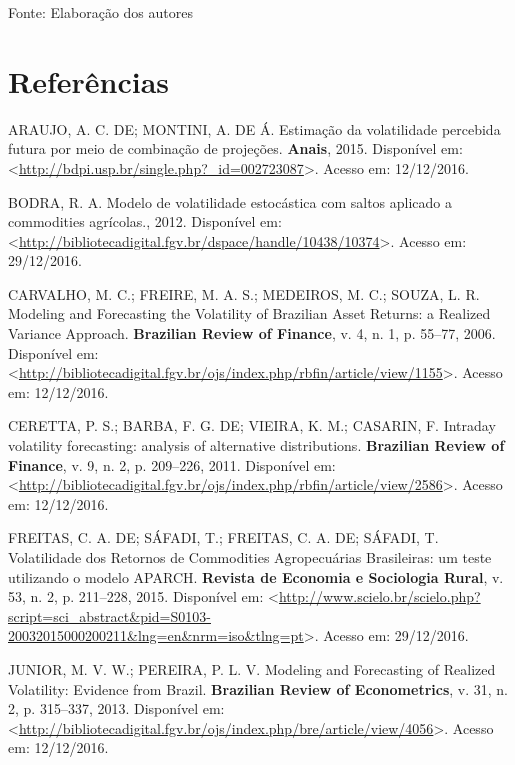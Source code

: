 \documentclass[]{article}
\begin{document}
Fonte: Elaboração dos autores

\pagebreak

\section*{Referências}\label{referencias}

\setlength{\parindent}{0in}

\hypertarget{refs}{}
\hypertarget{ref-araujo_estimacao_2015}{}
ARAUJO, A. C. DE; MONTINI, A. DE Á. Estimação da volatilidade percebida
futura por meio de combinação de projeções. \textbf{Anais}, 2015.
Disponível em:
\textless{}\url{http://bdpi.usp.br/single.php?_id=002723087}\textgreater{}.
Acesso em: 12/12/2016.

\hypertarget{ref-bodra_modelo_2012}{}
BODRA, R. A. Modelo de volatilidade estocástica com saltos aplicado a
commodities agrícolas., 2012. Disponível em:
\textless{}\url{http://bibliotecadigital.fgv.br/dspace/handle/10438/10374}\textgreater{}.
Acesso em: 29/12/2016.

\hypertarget{ref-carvalho_modeling_2006}{}
CARVALHO, M. C.; FREIRE, M. A. S.; MEDEIROS, M. C.; SOUZA, L. R.
Modeling and Forecasting the Volatility of Brazilian Asset Returns: a
Realized Variance Approach. \textbf{Brazilian Review of Finance}, v. 4,
n. 1, p. 55--77, 2006. Disponível em:
\textless{}\url{http://bibliotecadigital.fgv.br/ojs/index.php/rbfin/article/view/1155}\textgreater{}.
Acesso em: 12/12/2016.

\hypertarget{ref-ceretta_intraday_2011}{}
CERETTA, P. S.; BARBA, F. G. DE; VIEIRA, K. M.; CASARIN, F. Intraday
volatility forecasting: analysis of alternative distributions.
\textbf{Brazilian Review of Finance}, v. 9, n. 2, p. 209--226, 2011.
Disponível em:
\textless{}\url{http://bibliotecadigital.fgv.br/ojs/index.php/rbfin/article/view/2586}\textgreater{}.
Acesso em: 12/12/2016.

\hypertarget{ref-freitas_volatilidade_2015}{}
FREITAS, C. A. DE; SÁFADI, T.; FREITAS, C. A. DE; SÁFADI, T.
Volatilidade dos Retornos de Commodities Agropecuárias Brasileiras: um
teste utilizando o modelo APARCH. \textbf{Revista de Economia e
Sociologia Rural}, v. 53, n. 2, p. 211--228, 2015. Disponível em:
\textless{}\url{http://www.scielo.br/scielo.php?script=sci_abstract\&pid=S0103-20032015000200211\&lng=en\&nrm=iso\&tlng=pt}\textgreater{}.
Acesso em: 29/12/2016.

\hypertarget{ref-junior_modeling_2013}{}
JUNIOR, M. V. W.; PEREIRA, P. L. V. Modeling and Forecasting of Realized
Volatility: Evidence from Brazil. \textbf{Brazilian Review of
Econometrics}, v. 31, n. 2, p. 315--337, 2013. Disponível em:
\textless{}\url{http://bibliotecadigital.fgv.br/ojs/index.php/bre/article/view/4056}\textgreater{}.
Acesso em: 12/12/2016.
\end{document}
